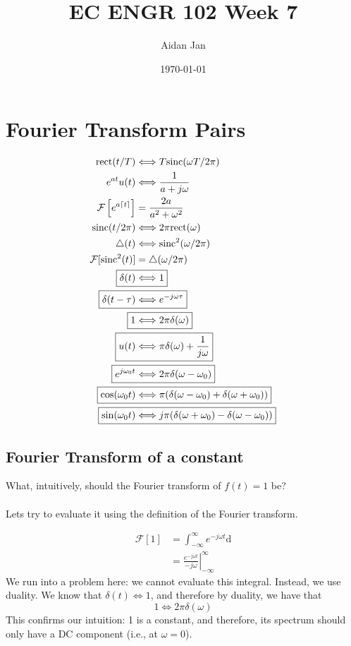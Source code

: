 \documentclass[10pt]{article}
\title{EC ENGR 102 Week 7}
\author{Aidan Jan}
\date{\today}
\newcommand{\sinc}{\text{sinc}}
\newcommand{\rect}{\text{rect}}
\newcommand{\llra}{\Longleftrightarrow}
\newcommand{\fourier}{\mathcal{F}}
\newcommand{\absint}{\int_{-\infty}^\infty}
\newcommand{\dd}{\text{d}}
\begin{document}
\maketitle

\section*{Fourier Transform Pairs}
\begin{align*}
    \rect(t/T) &\llra T \sinc(\omega T/2\pi)\\
    e^{at}u(t) &\llra \frac{1}{a + j\omega}\\
    \fourier\left[e^{a\lceil t \rceil}\right] &= \frac{2a}{a^2 + \omega^2}\\
    \sinc(t/2\pi) &\llra 2\pi \rect(\omega)\\
    \triangle(t) &\llra \sinc^2(\omega/2\pi)\\
    \fourier[\sinc^2(t)] &= \triangle(\omega / 2\pi)\\
    \Aboxed{\delta(t) &\llra 1}\\
    \Aboxed{\delta(t - \tau) &\llra e^{-j\omega \tau}}\\
    \Aboxed{1 &\llra 2\pi \delta(\omega)}\\
    \Aboxed{u(t) &\llra \pi \delta(\omega) + \frac{1}{j\omega}}\\
    \Aboxed{e^{j\omega_0 t} &\llra 2\pi \delta(\omega - \omega_0)}\\
    \Aboxed{\cos(\omega_0 t) &\llra \pi(\delta(\omega - \omega_0) + \delta(\omega + \omega_0))}\\
    \Aboxed{\sin(\omega_0 t) &\llra j\pi(\delta(\omega + \omega_0) - \delta(\omega - \omega_0))}
\end{align*}

\subsection*{Fourier Transform of a constant}
What, intuitively, should the Fourier transform of $f(t) = 1$ be?\\\\
Lets try to evaluate it using the definition of the Fourier transform.

\begin{align*}
    \fourier[1] &= \absint e^{-j\omega t} \dd\\
    &= \left.\frac{e^{-j\omega t}}{-j\omega}\right|^{\infty}_{-\infty}
\end{align*}
We run into a problem here: we cannot evaluate this integral.  Instead, we use duality.  We know that $\delta(t) \llra 1$, and therefore by duality, we have that
\[\boxed{1\llra 2\pi \delta(\omega)}\]
This confirms our intuition: 1 is a constant, and therefore, its spectrum should only have a DC component (i.e., at $\omega = 0$).
\end{document}
